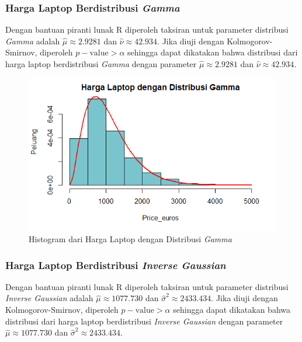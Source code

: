 \documentclass[12pt]{article}
\begin{document}
\subsubsection{Harga Laptop Berdistribusi \textit{Gamma}}
Dengan bantuan piranti lunak R diperoleh taksiran untuk parameter distribusi \textit{Gamma} adalah $\hat{\mu} \approx 2.9281$ dan $\hat{\nu} \approx 42.934$. Jika diuji dengan Kolmogorov-Smirnov, diperoleh $p-\text{value}>\alpha$ sehingga dapat dikatakan bahwa distribusi dari harga laptop berdistribusi \textit{Gamma} dengan parameter $\hat{\mu} \approx 2.9281$ dan $\hat{\nu} \approx 42.934$.   
\begin{figure}[h!]
    \centering
    \includegraphics[scale = 0.5]{distg.png}
    \caption{Histogram dari Harga Laptop dengan Distribusi \textit{Gamma}}
    \label{fig:ashi}
\end{figure}  

\subsubsection{Harga Laptop Berdistribusi \textit{Inverse Gaussian}}
Dengan bantuan piranti lunak R diperoleh taksiran untuk parameter distribusi \textit{Inverse Gaussian} adalah $\hat{\mu} \approx 1077.730$ dan $\hat{\sigma}^2 \approx 2433.434$. Jika diuji dengan Kolmogorov-Smirnov, diperoleh $p-\text{value}>\alpha$ sehingga dapat dikatakan bahwa distribusi dari harga laptop berdistribusi \textit{Inverse Gaussian} dengan parameter $\hat{\mu} \approx 1077.730$ dan $\hat{\sigma}^2 \approx 2433.434$.
   
\end{document}
